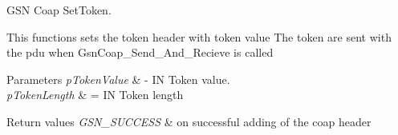 GSN Coap SetToken. 

This functions sets the token header with token value The token are sent with the pdu when GsnCoap\_\-Send\_\-And\_\-Recieve is called


\begin{DoxyParams}{Parameters}
{\em pTokenValue} & -\/ IN Token value. \\
\hline
{\em pTokenLength} & = IN Token length\\
\hline
\end{DoxyParams}

\begin{DoxyRetVals}{Return values}
{\em GSN\_\-SUCCESS} & on successful adding of the coap header \\
\hline
\end{DoxyRetVals}
